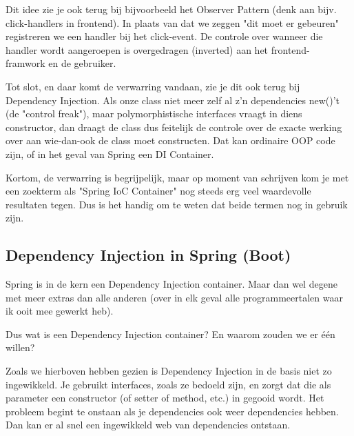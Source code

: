 Dit idee zie je ook terug bij bijvoorbeeld het Observer Pattern (denk aan bijv. click-handlers in 
frontend). In plaats van dat we zeggen "dit moet er gebeuren" registreren we een handler bij het click-event.
De controle over wanneer die handler wordt aangeroepen is overgedragen (inverted) aan het frontend-
framwork en de gebruiker.

Tot slot, en daar komt de verwarring vandaan, zie je dit ook terug bij Dependency Injection.
Als onze class niet meer zelf al z'n dependencies new()'t (de "control freak"), maar polymorphistische
interfaces vraagt in diens constructor, dan draagt de class dus feitelijk de controle over 
de exacte werking over aan wie-dan-ook de class moet constructen. Dat kan ordinaire OOP code zijn,
of in het geval van Spring een DI Container.

Kortom, de verwarring is begrijpelijk, maar op moment van schrijven kom je met een zoekterm 
als "Spring IoC Container" nog steeds erg veel waardevolle resultaten tegen. 
Dus is het handig om te weten dat beide termen nog in gebruik zijn.


\subsection{Dependency Injection in Spring (Boot)}

Spring is in de kern een Dependency Injection container. Maar dan wel degene met meer extras dan alle anderen 
(over in elk geval alle programmeertalen waar ik ooit mee gewerkt heb).

Dus wat is een Dependency Injection container? En waarom zouden we er één willen?

Zoals we hierboven hebben gezien is Dependency Injection in de basis niet zo ingewikkeld. Je gebruikt interfaces,
zoals ze bedoeld zijn, en zorgt dat die als parameter een constructor (of setter of method, etc.) in gegooid wordt.
Het probleem begint te onstaan als je dependencies ook weer dependencies hebben. Dan kan er al snel een ingewikkeld 
web van dependencies ontstaan.

